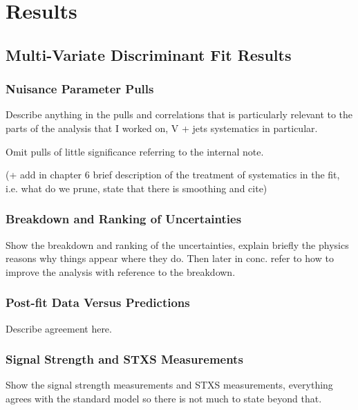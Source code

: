 \chapter{Results}%
\label{ch:results}
\section{\texorpdfstring{\VHbb}{VH->bb} Multi-Variate Discriminant Fit Results}%
\label{sec:mva-results}

\subsection{Nuisance Parameter Pulls}
Describe anything in the pulls and correlations that is particularly relevant to
the parts of the analysis that I worked on, V + jets systematics in particular.

Omit pulls of little significance referring to the internal note.

(+ add in chapter 6 brief description of the treatment of systematics in the
fit, i.e. what do we prune, state that there is smoothing and cite)


\subsection{Breakdown and Ranking of Uncertainties}
Show the breakdown and ranking of the uncertainties, explain briefly the physics
reasons why things appear where they do. Then later in conc. refer to how to
improve the analysis with reference to the breakdown.



\subsection{Post-fit Data Versus Predictions}
Describe agreement here.







\clearpage

\subsection{Signal Strength and STXS Measurements}
Show the signal strength measurements and STXS measurements, everything agrees
with the standard model so there is not much to state beyond that.

